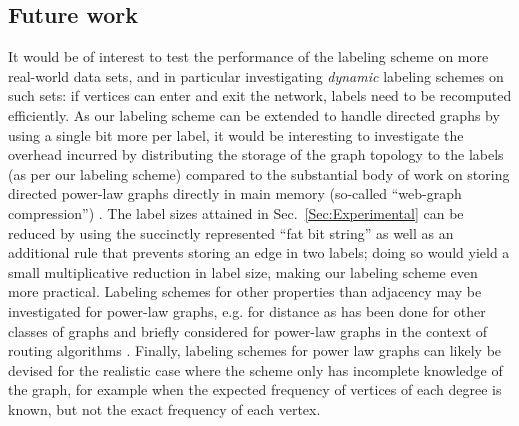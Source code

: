 \subsection{Future work}

It would be of interest to test the performance of the labeling scheme on more real-world data sets, and in particular investigating \emph{dynamic} labeling schemes on such sets: if vertices can enter and exit the network, labels need to be recomputed efficiently.
As our labeling scheme can be extended to handle directed graphs by using a single bit more per label, it would be interesting to investigate the overhead incurred by distributing the storage of the graph topology to the labels (as per our labeling scheme) compared to the substantial body of work on storing directed power-law graphs directly in main memory (so-called ``web-graph compression'') \cite{guillaume2002efficient,asano2003compact, asano2008efficient,claude2010fast}.
The  label sizes attained in Sec.~\ref{Sec:Experimental} can be reduced by using the succinctly represented ``fat bit string'' as well as an additional rule that prevents storing  an edge in two  labels; doing so would yield a small multiplicative reduction in label size, making our labeling scheme even more practical. 
Labeling schemes for other properties than adjacency may be investigated for power-law graphs, e.g. for distance as has been done for other classes of graphs \cite{alstrup2005labeling}
and briefly considered for power-law graphs in the context of routing algorithms \cite{chen2012compact}.
Finally, labeling schemes for power law graphs can likely be devised for the realistic case where the scheme only has incomplete knowledge of the graph, for example when the expected frequency of vertices of each degree is known, but not the exact frequency of each vertex.


